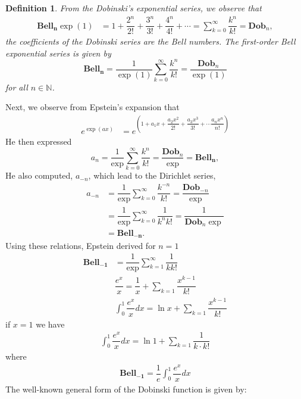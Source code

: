 \documentclass[pdflatex,sn-mathphys-num]{sn-jnl}%
\newtheorem{definition}{Definition}
\theoremstyle{thmstyleone}%
\theoremstyle{thmstyletwo}%
\theoremstyle{thmstylethree}%
\newcommand{\BN}{\mathbb{N}}
\begin{document}
\begin{definition}\label{Bell}\cite{bell1934exponential, spivey2008generalized}
From the Dobinski's exponential series, we observe that 
\begin{align*}
     \mathbf{Bell_{n}} \exp(1)&= 1+\dfrac{2^n}{2!}+\dfrac{3^n}{3!}+\dfrac{4^n}{4!}+\cdots =\sum_{k=0}^{\infty}\dfrac{k^n}{k!}=\mathbf{Dob}_{n},
\end{align*}
the coefficients of the Dobinski series are the Bell numbers. The first-order Bell exponential series is given by 
$$\mathbf{Bell_{n}}=\dfrac{1}{\exp(1)}\sum_{k=0}^{\infty}\dfrac{k^n}{k!}=\dfrac{\mathbf{Dob}_n }{\exp(1)} $$
    for all $n\in \BN$.
\end{definition}
Next, we observe from Epstein's expansion \cite{epstein1939function} that
\begin{align*}
     e^{\exp{(ax)}}&=e^{\left ( 1+a_1 x + \dfrac{a_2 x^2}{2!}+\dfrac{a_3 x^3 }{3!}+\cdots \dfrac{a_n x^n}{n!}\right)}
\end{align*}
He then expressed 
$$a_n=\dfrac{1}{\exp}\sum_{k=0}^{\infty}\dfrac{k^n}{k!}=\dfrac{\mathbf{Dob}_{n}}{\exp}=\mathbf{Bell_{n}},$$
He also computed, $a_{-n}$, which lead to the Dirichlet series,
\begin{align*}
a_{-n}&=\dfrac{1}{\exp}\sum_{k=0}^{\infty}\dfrac{k^{-n}}{k!}=\dfrac{\mathbf{Dob}_{-n}}{\exp}\\ \nonumber
&=\dfrac{1}{\exp}\sum_{k=0}^{\infty}\dfrac{1}{k^n k!}=\dfrac{1}{\mathbf{Dob}_{n}\exp}
\\ \nonumber 
&=\mathbf{Bell_{-n}}.
\end{align*}
Using these relations, Epstein \cite{epstein1939function, williams1945numbers} derived for $n=1$
\begin{align*}
    \mathbf{Bell_{-1}}&=\dfrac{1}{\exp}\sum_{k=1}^{\infty}\dfrac{1}{k k!}\\ \nonumber
    &\dfrac{e^x}{x}=\dfrac{1}{x}+ \sum_{k=1}\dfrac{x^{k-1}}{k!}\\ \nonumber
    & \int_{0}^{1}\dfrac{e^x}{x} dx =\ln{x}+ 
    \sum_{k=1}\dfrac{x^{k-1}}{k!}
\end{align*}
if $x=1$ we have 
\begin{align*}
    \int_{0}^{1}\dfrac{e^x}{x}dx =\ln{1}+ 
    \sum_{k=1}\dfrac{1}{k\cdotp k!}
\end{align*}
where 
\begin{align*}
    \mathbf{Bell_{-1}}=\dfrac{1}{e}\int_{0}^{1}\dfrac{e^x}{x}dx 
\end{align*}
The well-known general form of the Dobinski function is given by:
\end{document}

